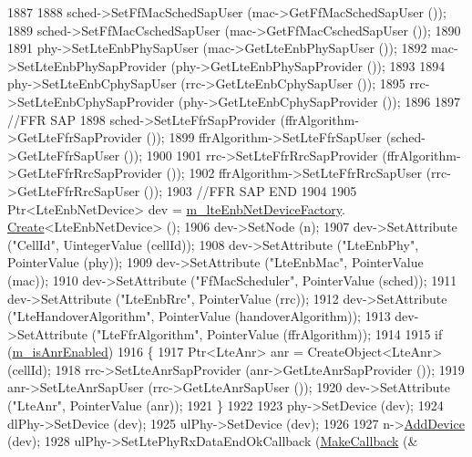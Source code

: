 \begin{DoxyCode}
1887 
1888         sched->SetFfMacSchedSapUser (mac->GetFfMacSchedSapUser ());
1889         sched->SetFfMacCschedSapUser (mac->GetFfMacCschedSapUser ());
1890 
1891         phy->SetLteEnbPhySapUser (mac->GetLteEnbPhySapUser ());
1892         mac->SetLteEnbPhySapProvider (phy->GetLteEnbPhySapProvider ());
1893 
1894         phy->SetLteEnbCphySapUser (rrc->GetLteEnbCphySapUser ());
1895         rrc->SetLteEnbCphySapProvider (phy->GetLteEnbCphySapProvider ());
1896 
1897         \textcolor{comment}{//FFR SAP}
1898         sched->SetLteFfrSapProvider (ffrAlgorithm->GetLteFfrSapProvider ());
1899         ffrAlgorithm->SetLteFfrSapUser (sched->GetLteFfrSapUser ());
1900 
1901         rrc->SetLteFfrRrcSapProvider (ffrAlgorithm->GetLteFfrRrcSapProvider ());
1902         ffrAlgorithm->SetLteFfrRrcSapUser (rrc->GetLteFfrRrcSapUser ());
1903         \textcolor{comment}{//FFR SAP END}
1904 
1905         Ptr<LteEnbNetDevice> dev = \hyperlink{classns3_1_1MmWaveHelper_a4434a934b52d68cf43b6a9d46690ad2f}{m\_lteEnbNetDeviceFactory}.
      \hyperlink{classns3_1_1ObjectFactory_a18152e93f0a6fe184ed7300cb31e9896}{Create}<LteEnbNetDevice> ();
1906         dev->SetNode (n);
1907         dev->SetAttribute (\textcolor{stringliteral}{"CellId"}, UintegerValue (cellId)); 
1908         dev->SetAttribute (\textcolor{stringliteral}{"LteEnbPhy"}, PointerValue (phy));
1909         dev->SetAttribute (\textcolor{stringliteral}{"LteEnbMac"}, PointerValue (mac));
1910         dev->SetAttribute (\textcolor{stringliteral}{"FfMacScheduler"}, PointerValue (sched));
1911         dev->SetAttribute (\textcolor{stringliteral}{"LteEnbRrc"}, PointerValue (rrc)); 
1912         dev->SetAttribute (\textcolor{stringliteral}{"LteHandoverAlgorithm"}, PointerValue (handoverAlgorithm));
1913         dev->SetAttribute (\textcolor{stringliteral}{"LteFfrAlgorithm"}, PointerValue (ffrAlgorithm));
1914 
1915         \textcolor{keywordflow}{if} (\hyperlink{classns3_1_1MmWaveHelper_aca7f0b0f8f8f2898ac833811221d056d}{m\_isAnrEnabled})
1916         \{
1917           Ptr<LteAnr> anr = CreateObject<LteAnr> (cellId);
1918           rrc->SetLteAnrSapProvider (anr->GetLteAnrSapProvider ());
1919           anr->SetLteAnrSapUser (rrc->GetLteAnrSapUser ());
1920           dev->SetAttribute (\textcolor{stringliteral}{"LteAnr"}, PointerValue (anr));
1921         \}
1922 
1923         phy->SetDevice (dev);
1924         dlPhy->SetDevice (dev);
1925         ulPhy->SetDevice (dev);
1926 
1927         n->\hyperlink{classns3_1_1Node_a42ff83ee1d5d1649c770d3f5b62375de}{AddDevice} (dev);
1928         ulPhy->SetLtePhyRxDataEndOkCallback (\hyperlink{group__makecallbackmemptr_ga9376283685aa99d204048d6a4b7610a4}{MakeCallback} (&

\end{DoxyCode}
